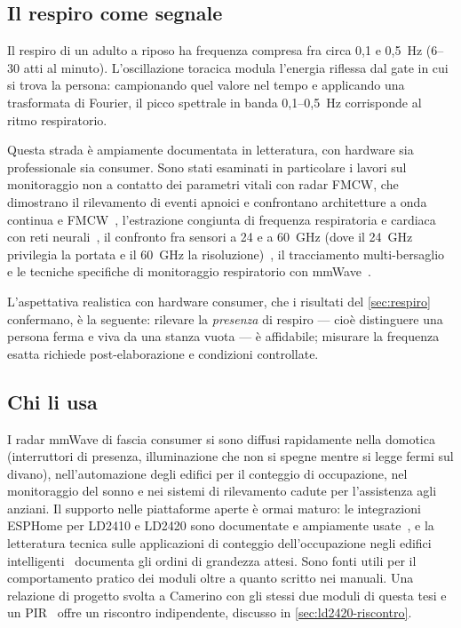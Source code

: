 \subsection{Il respiro come segnale}
\label{sec:respiro-teoria}

Il respiro di un adulto a riposo ha frequenza compresa fra circa 0,1 e 0,5~Hz
(6--30 atti al minuto). L'oscillazione toracica modula l'energia riflessa dal gate
in cui si trova la persona: campionando quel valore nel tempo e applicando una
trasformata di Fourier, il picco spettrale in banda 0,1--0,5~Hz corrisponde al
ritmo respiratorio.

Questa strada è ampiamente documentata in letteratura, con hardware sia
professionale sia consumer. Sono stati esaminati in particolare i lavori
sul monitoraggio non a contatto dei parametri vitali con radar FMCW, che
dimostrano il rilevamento di eventi apnoici e confrontano architetture a onda
continua e FMCW~\cite{upm2024vitals}, l'estrazione congiunta di frequenza
respiratoria e cardiaca con reti neurali~\cite{uts2024vitals}, il confronto fra
sensori a 24 e a 60~GHz (dove il 24~GHz privilegia la portata e il 60~GHz la
risoluzione)~\cite{theseus2024}, il tracciamento multi-bersaglio~\cite{uts2023mot}
e le tecniche specifiche di monitoraggio respiratorio con
mmWave~\cite{mdpi2024mmwaverm}.

L'aspettativa realistica con hardware consumer, che i risultati del
\cref{sec:respiro} confermano, è la seguente: rilevare la \emph{presenza} di
respiro --- cioè distinguere una persona ferma e viva da una stanza vuota --- è
affidabile; misurare la frequenza esatta richiede post-elaborazione e condizioni
controllate.

\subsection{Chi li usa}

I radar mmWave di fascia consumer si sono diffusi rapidamente nella domotica
(interruttori di presenza, illuminazione che non si spegne mentre si legge fermi
sul divano), nell'automazione degli edifici per il conteggio di occupazione, nel
monitoraggio del sonno e nei sistemi di rilevamento cadute per l'assistenza agli
anziani. Il supporto nelle piattaforme aperte è ormai maturo: le integrazioni
ESPHome per LD2410 e LD2420 sono documentate e ampiamente
usate~\cite{esphomeLD2410,esphomeLD2420,espboards}, e la letteratura tecnica sulle
applicazioni di conteggio dell'occupazione negli edifici
intelligenti~\cite{mmwaveOccupancy} documenta gli ordini di grandezza attesi. Sono
fonti utili per il
comportamento pratico dei moduli oltre a quanto scritto nei manuali. Una relazione
di progetto svolta a Camerino con gli stessi due moduli di questa tesi e un
PIR~\cite{dellaquila2026} offre un riscontro indipendente, discusso in
\cref{sec:ld2420-riscontro}.

